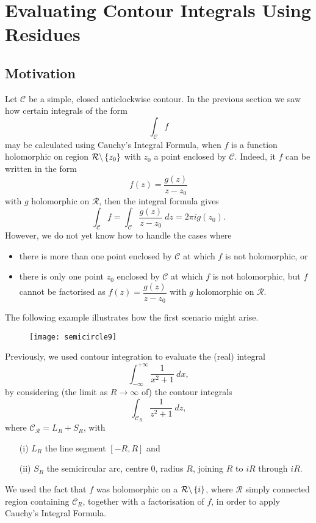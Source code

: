 
\chapter{Evaluating Contour Integrals Using Residues}
\section{Motivation}
Let $\mathcal{C}$ be a simple, closed anticlockwise contour.  In the previous section we saw how certain integrals of the form
\[
\int_{\mathcal{C}} f
\]
may be calculated using Cauchy's Integral Formula, when $f$ is a function holomorphic on region $\mathcal{R} \backslash \left\{z_0\right\}$ with $z_0$ a point enclosed by $\mathcal{C}$.  Indeed, it $f$ can be written in the form
\[
f(z) = \frac{g(z)}{z-z_0}
\]
with $g$ holomorphic on $\mathcal{R}$, then the integral formula gives
\[
\int_{\mathcal{C}} f = \int_{\mathcal{C}} \frac{g(z)}{z-z_0}\ dz = 2\pi i g(z_0).
\]
However, we do not yet know how to handle the cases where
\begin{itemize}
\item there is more than one point enclosed by $\mathcal{C}$ at which $f$ is not holomorphic, or
\item there is only one point $z_0$ enclosed by $\mathcal{C}$ at which $f$ is not holomorphic, but $f$ cannot be factorised as $f(z) =  \dfrac{g(z)}{z-z_0}$ with $g$ holomorphic on $\mathcal{R}$.
\end{itemize}
The following example illustrates how the first scenario might arise.
\begin{note}
\begin{wrapfigure}{r}[2.5cm]{0.4\textwidth}
\texttt{[image: semicircle9]}
\end{wrapfigure} 
Previously, we used contour integration to evaluate the (real) integral
\[
\int_{-\infty}^{+\infty} \frac{1}{x^2+1}\ dx,
\]
by considering (the limit as $R \to \infty$ of) the contour integrals
\[
\int_{\mathcal{C}_R} \frac{1}{z^2+1}\ dz,
\]
where $\mathcal{C_R} = L_R+S_R$, with
\begin{itemize}
\item[(i)] $L_R$ the line segment $[-R,R]$ and
\item[(ii)] $S_R$ the semicircular arc, centre 0, radius $R$, joining $R$ to $iR$ through $iR$.
\end{itemize} 

We used the fact that $f$ was holomorphic on a  $\mathcal{R} \backslash \left\{i\right\}$, where $\mathcal{R}$ simply connected region containing $\mathcal{C}_R$, together with a factorisation of $f$, in order to apply Cauchy's Integral Formula.
\end{note}

